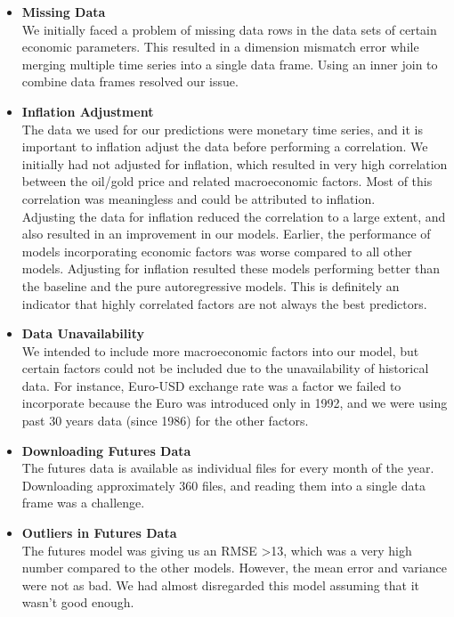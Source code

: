 \documentclass[runningheads]{llncs}
\begin{document}
\begin{itemize}

\item \textbf{Missing Data} \\
We initially faced a problem of missing data rows in the data sets of certain economic parameters. This resulted in a dimension mismatch error while merging multiple time series into a single data frame. Using an inner join to combine data frames resolved our issue. \\

\item \textbf{Inflation Adjustment} \\
The data we used for our predictions were monetary time series, and it is important to inflation adjust the data before performing a correlation. We initially had not adjusted for inflation, which resulted in very high correlation between the oil/gold price and related macroeconomic factors. Most of this correlation was meaningless and could be attributed to inflation. \\

Adjusting the data for inflation reduced the correlation to a large extent, and also resulted in an improvement in our models. Earlier, the performance of models incorporating economic factors was worse compared to all other models. Adjusting for inflation resulted these models performing better than the baseline and the pure autoregressive models. This is definitely an indicator that highly correlated factors are not always the best predictors. \\

\item \textbf{Data Unavailability} \\
We intended to include more macroeconomic factors into our model, but certain factors could not be included due to the unavailability of historical data. For instance, Euro-USD exchange rate was a factor we failed to incorporate because the Euro was introduced only in 1992, and we were using past 30 years data (since 1986) for the other factors.  \\

\item \textbf{Downloading Futures Data} \\
The futures data is available as individual files for every month of the year. Downloading approximately 360 files, and reading them into a single data frame was a challenge. 

\item \textbf{Outliers in Futures Data} \\
The futures model was giving us an RMSE >13, which was a very high number compared to the other models. However, the mean error and variance were not as bad. We had almost disregarded this model assuming that it wasn't good enough. \\


\end{itemize}
\end{document}
